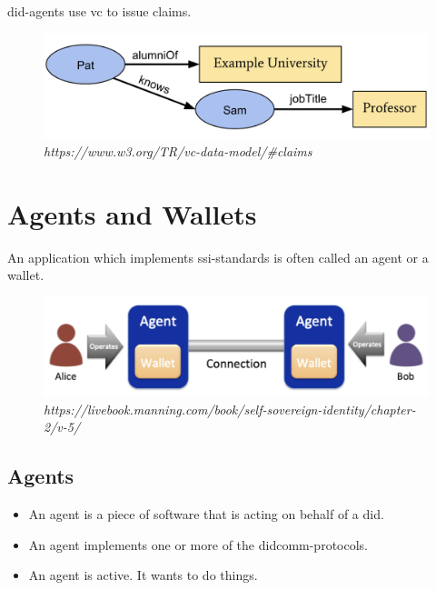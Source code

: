 \acrshort{did}-agents use \acrshort{vc} to issue claims. 

\begin{figure}[htbp]
  \centering
  \includegraphics[width=1\textwidth]{figures/claims-example.png}
  \caption{\textit{https://www.w3.org/TR/vc-data-model/#claims}}
\end{figure}








\newpage

\section{Agents and Wallets}

An application which implements \acrshort{ssi}-standards is often called an agent or a wallet.

\begin{figure}[htbp]
  \centering
  \includegraphics[width=1\textwidth]{figures/agents-and-wallets.png}
  \caption{\textit{https://livebook.manning.com/book/self-sovereign-identity/chapter-2/v-5/}}
\end{figure}


\subsection{Agents}

\begin{itemize}
    \item An agent is a piece of software that is acting on behalf of a \acrshort{did}.
    \item An agent implements one or more of the \acrshort{didcomm}-protocols.
    \item An agent is active. It wants to do things.
\end{itemize}


